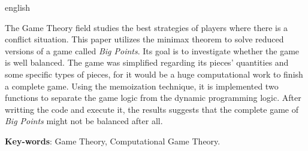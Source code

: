 \begin{resumo}[Abstract]
 \begin{otherlanguage*}{english}
	
The Game Theory field studies the best strategies of players where there is a conflict situation.
This paper utilizes the minimax theorem to solve reduced versions of a game called \emph{Big Points}.
Its goal is to investigate whether the game is well balanced.
The game was simplified regarding its pieces' quantities and some specific types of pieces, for it would be a huge computational work to finish a complete game.
Using the memoization technique, it is implemented two functions to separate the game logic from the dynamic programming logic.
After writting the code and execute it, the results suggests that the complete game of \emph{Big Points} might not be balanced after all.


   \vspace{\onelineskip}

   \noindent
   \textbf{Key-words}: Game Theory, Computational Game Theory.
 \end{otherlanguage*}
\end{resumo}
